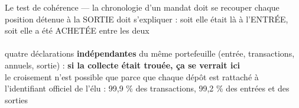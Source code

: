 \documentclass[11pt,aspectratio=169]{beamer}
\begin{document}
\begin{frame}{Le test de cohérence — la chronologie d'un mandat doit se recouper}
  \centering
  {\footnotesize chaque position détenue à la SORTIE doit s'expliquer : soit elle était là
   à l'ENTRÉE, soit elle a été ACHETÉE entre les deux}\\[4mm]
  \\[4mm]
  {\footnotesize quatre déclarations \textbf{indépendantes} du même portefeuille (entrée,
   transactions, annuels, sortie) : \textbf{si la collecte était trouée, ça se verrait ici}}\\[1.5mm]
  {\scriptsize\color{black!60} le croisement n'est possible que parce que chaque dépôt est
   rattaché à l'identifiant officiel de l'élu : 99,9 \% des transactions,
   99,2 \% des entrées et des sorties}
\end{frame}
\end{document}
